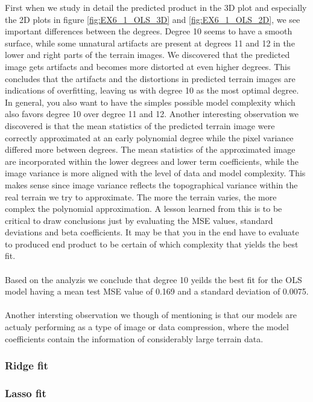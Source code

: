 \documentclass[11pt, a4paper]{article}
\begin{document}
First when we study in detail the predicted product in the 3D plot and especially the 2D plots in figure \ref{fig:EX6_1_OLS_3D} and \ref{fig:EX6_1_OLS_2D}, we see important differences between the degrees. 
Degree 10 seems to have a smooth surface, while some unnatural artifacts are present at degrees 11 and 12 in the lower and right parts of the terrain images. We discovered that the predicted image gets artifacts and becomes more distorted at even higher degrees. 
This concludes that the artifacts and the distortions in predicted terrain images are indications of overfitting, leaving us with degree 10 as the most optimal degree. In general, you also want to have 
the simples possible model complexity which also favors degree 10 over degree 11 and 12. 
Another interesting observation we discovered is that the mean statistics of the predicted terrain image were correctly approximated at an early polynomial degree while the pixel variance differed more between degrees. 
The mean statistics of the approximated image are incorporated within the lower degrees and lower term coefficients, while the image variance is more aligned with the level of data and model complexity. 
This makes sense since image variance reflects the topographical variance within the real terrain we try to approximate. The more the terrain varies, the more complex the polynomial approximation. 
A lesson learned from this is to be critical to draw conclusions just by evaluating the MSE values, standard deviations and beta coefficients. It may be that you in the end have to 
evaluate to produced end product to be certain of which complexity that yields the best fit. 
\\\\
Based on the analyzis we conclude that degree 10 yeilds the best fit for the OLS model having a mean test MSE value of 0.169 and a standard deviation of 0.0075.
\\\\
Another intersting observation we though of mentioning is that our models are actualy performing as a type of image or data compression, where the model coefficients contain the information of considerably large terrain data. 

\subsubsection*{Ridge fit}
\subsubsection*{Lasso fit}
\end{document}
